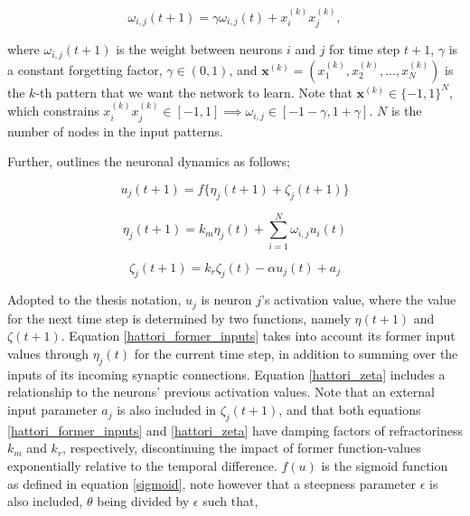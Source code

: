 \begin{equation}\label{hattori_hebbian_learning}
    \omega_{i,j}(t+1) = \gamma \omega_{i,j}(t) + x_i^{(k)} x_j^{(k)},
\end{equation}

where $\omega_{i,j}(t+1)$ is the weight between neurons $i$ and $j$ for time step $t+1$, $\gamma$ is a constant forgetting factor, $\gamma \in (0, 1)$, and $\textbf{x}^{(k)} = (x_1^{(k)}, x_2^{(k)}, ..., x_N^{(k)})$ is the $k$-th pattern that we want the network to learn. Note that $\textbf{x}^{(k)} \in \{-1,1\}^N$, which constrains $x_i^{(k)} x_j^{(k)} \in [-1,1] \implies \omega_{i,j} \in [-1-\gamma, 1+\gamma]$. $N$ is the number of nodes in the input patterns.

Further, \cite{Hattori2010} outlines the neuronal dynamics as follows;

\begin{equation}\label{hattori_next_output}
    u_j(t+1) = f\{\eta_j (t+1) + \zeta_j(t+1)\}
\end{equation}

\begin{equation}\label{hattori_former_inputs}
    \eta_j(t+1) = k_m \eta_j(t) + \sum_{i=1}^{N} \omega_{i,j} u_i(t)
\end{equation}

\begin{equation}\label{hattori_zeta}
    \zeta_j(t+1) = k_r \zeta_j(t) - \alpha u_j(t) + a_j
\end{equation}

Adopted to the thesis notation, $u_j$ is neuron $j$'s activation value, where the value for the next time step is determined by two functions, namely $\eta(t+1)$ and $\zeta(t+1)$. Equation \ref{hattori_former_inputs} takes into account its former input values through $\eta_j(t)$ for the current time step, in addition to summing over the inputs of its incoming synaptic connections. Equation \ref{hattori_zeta} includes a relationship to the neurons' previous activation values. Note that an external input parameter $a_j$ is also included in $\zeta_j(t+1)$, and that both equations \ref{hattori_former_inputs} and \ref{hattori_zeta} have damping factors of refractoriness $k_m$ and $k_r$, respectively, discontinuing the impact of former function-values exponentially relative to the temporal difference. $f(u)$ is the sigmoid function as defined in equation \ref{sigmoid}, note however that a steepness parameter $\epsilon$ is also included, $\theta$ being divided by $\epsilon$ such that,

